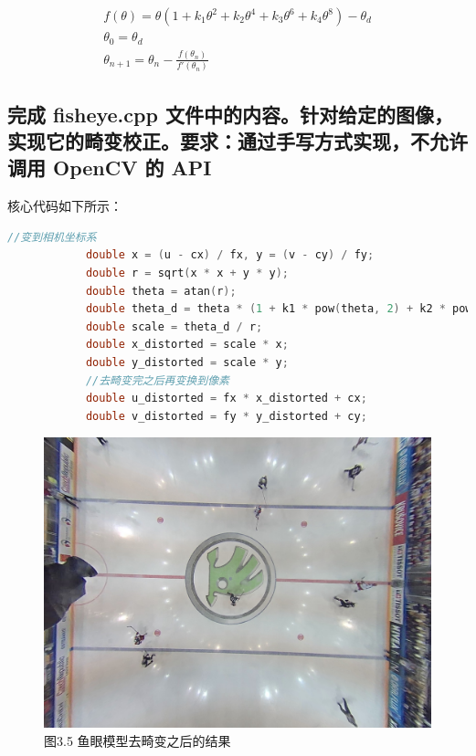 \documentclass[40pt,a4paper，UTF8]{ctexart}
\numberwithin{equation}{section}
\begin{document}
\begin{equation}
\begin{array}{c}
f(\theta) = \theta (1+k_1\theta^2+k_2\theta^4+k_3\theta^6+k_4\theta^8)-\theta_d \\ 
\theta_0 = \theta_d \\
\theta_{n+1} = \theta_n - \frac{f(\theta_n)}{f'(\theta_n)}
\end{array}
\end{equation}


\subsection{完成 fisheye.cpp 文件中的内容。针对给定的图像，实现它的畸变校正。要求：通过手写方式实现，不允许调用 OpenCV 的 API}
核心代码如下所示：
\begin{lstlisting}[language=C++, caption=工程/CMakeLists.txt]
            //变到相机坐标系
            double x = (u - cx) / fx, y = (v - cy) / fy;
            double r = sqrt(x * x + y * y);
            double theta = atan(r);
            double theta_d = theta * (1 + k1 * pow(theta, 2) + k2 * pow(theta, 4) + k3 * pow(theta, 6) + k4 * pow(theta, 8));
            double scale = theta_d / r;
            double x_distorted = scale * x;
            double y_distorted = scale * y;
            //去畸变完之后再变换到像素
            double u_distorted = fx * x_distorted + cx;
            double v_distorted = fy * y_distorted + cy;
\end{lstlisting}

\begin{figure}[H]
\centering
\includegraphics[width=4.8in]{ch4_3_1.jpg} {图3.5 鱼眼模型去畸变之后的结果}
\end{figure}
\end{document}
